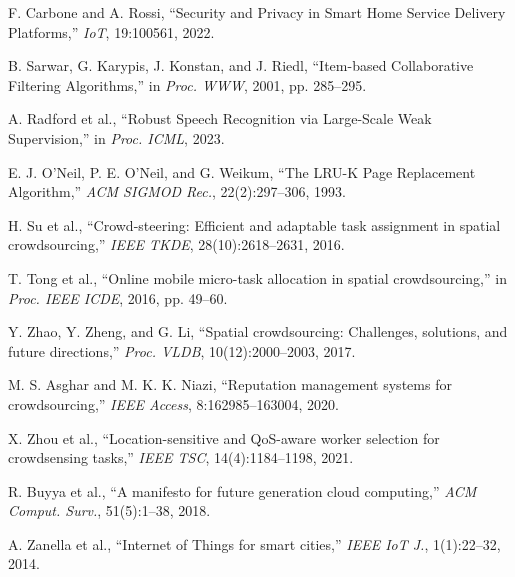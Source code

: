 \documentclass[10pt,twocolumn,a4paper]{article}
\begin{document}
{\noindent [15] F. Carbone and A. Rossi, ``Security and Privacy in Smart Home Service Delivery Platforms,'' \textit{IoT}, 19:100561, 2022.\par
\noindent [16] B. Sarwar, G. Karypis, J. Konstan, and J. Riedl, ``Item-based Collaborative Filtering Algorithms,'' in \textit{Proc. WWW}, 2001, pp. 285--295.\par
\noindent [17] A. Radford et al., ``Robust Speech Recognition via Large-Scale Weak Supervision,'' in \textit{Proc. ICML}, 2023.\par
\noindent [18] E. J. O'Neil, P. E. O'Neil, and G. Weikum, ``The LRU-K Page Replacement Algorithm,'' \textit{ACM SIGMOD Rec.}, 22(2):297--306, 1993.\par
\noindent [19] H. Su et al., ``Crowd-steering: Efficient and adaptable task assignment in spatial crowdsourcing,'' \textit{IEEE TKDE}, 28(10):2618--2631, 2016.\par
\noindent [20] T. Tong et al., ``Online mobile micro-task allocation in spatial crowdsourcing,'' in \textit{Proc. IEEE ICDE}, 2016, pp. 49--60.\par
\noindent [21] Y. Zhao, Y. Zheng, and G. Li, ``Spatial crowdsourcing: Challenges, solutions, and future directions,'' \textit{Proc. VLDB}, 10(12):2000--2003, 2017.\par
\noindent [22] M. S. Asghar and M. K. K. Niazi, ``Reputation management systems for crowdsourcing,'' \textit{IEEE Access}, 8:162985--163004, 2020.\par
\noindent [23] X. Zhou et al., ``Location-sensitive and QoS-aware worker selection for crowdsensing tasks,'' \textit{IEEE TSC}, 14(4):1184--1198, 2021.\par
\noindent [24] R. Buyya et al., ``A manifesto for future generation cloud computing,'' \textit{ACM Comput. Surv.}, 51(5):1--38, 2018.\par
\noindent [25] A. Zanella et al., ``Internet of Things for smart cities,'' \textit{IEEE IoT J.}, 1(1):22--32, 2014.\par
}
\end{document}
